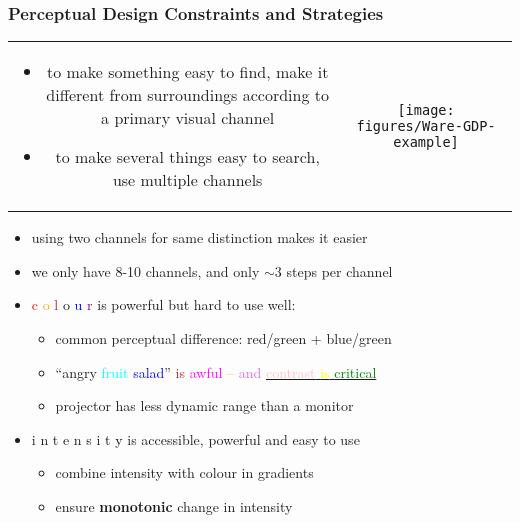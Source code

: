 \documentclass{beamer}
\newcommand{\key}[1]{\textcolor{keyred}{{\bf #1}}}
\newcommand{\theref}{\ensuremath{\dot{.~.}~}}
\begin{document}
\begin{frame}
\frametitle{Perceptual Design Constraints and Strategies}
\begin{tabular}{@{}cc}
\begin{minipage}{0.65\textwidth}
\begin{itemize}
\item to make something easy to find, make it different from
		surroundings according to a primary visual channel
\item to make several things easy to search, use multiple channels
\end{itemize}
\end{minipage}&
\begin{minipage}{0.4\textwidth}
\texttt{[image: figures/Ware-GDP-example]}\footnotemark[2]
\end{minipage}
\end{tabular}
\begin{itemize}
\item using two channels for same distinction makes it easier
\item we only have 8-10 channels, and only $\sim 3$ steps per channel
\pause
\item
		\textcolor{red}{c}%
		\textcolor{orange}{o}%
		\textcolor{brown}{l}%
		\textcolor{jade}{o}%
		\textcolor{blue}{u}%
		\textcolor{purple}{r} is powerful but hard to use well:
	\begin{itemize}
	\item common perceptual difference: red/green + blue/green
	\item
		``\textcolor{jade}{angry}
		\textcolor{cyan}{fruit}
		\textcolor{blue}{salad}''
		\textcolor{brown}{is}
		\textcolor{magenta}{awful}
		\textcolor{orange}{--}
		\textcolor{orchid}{and}
		\underline{\textcolor{pink}{contrast}
		\textcolor{yellow}{is}
		\textcolor{green}{critical}}
	\item projector has less dynamic range than a monitor
	\end{itemize}
	\pause
\item
	\textcolor{grey1}{i}%
	\textcolor{grey2}{n}%
	\textcolor{grey3}{t}%
	\textcolor{grey4}{e}%
	\textcolor{grey5}{n}%
	\textcolor{grey6}{s}%
	\textcolor{grey7}{i}%
	\textcolor{grey8}{t}%
	\textcolor{black}{y}
	is accessible, powerful and easy to use
	\begin{itemize}
	\item combine intensity with colour in gradients
	\item ensure \key{monotonic} change in intensity
	\end{itemize}
\end{itemize}
\end{frame}
\end{document}
